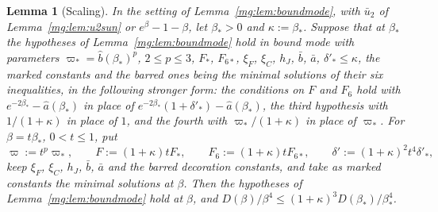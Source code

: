 \documentclass[11pt,a4paper]{article}
\newtheorem{lemma}[theorem]{Lemma}
\theoremstyle{definition}
\theoremstyle{remark}
\begin{document}
\begin{lemma}[Scaling]\label{mg:lem:scaling}
In the setting of Lemma~\ref{mg:lem:boundmode}, with $\bar u_2$ of Lemma~\ref{mg:lem:u2sun} or $e^\beta-1-\beta$, let $\beta_*>0$ and $\kappa:=\beta_*$. Suppose that at $\beta_*$ the hypotheses of
Lemma~\ref{mg:lem:boundmode} hold in bound mode with parameters $\varpi_*=\hat b(\beta_*)^p$, $2\le p\le3$, $F_*$, $F_{6*}$, $\xi_F$, $\xi_C$, $h_J$, $\bar b$, $\bar a$, $\delta'_*\le\kappa$, the marked constants and
the barred ones being the minimal solutions of their six inequalities, in the following stronger form: the conditions on $F$ and $F_6$ hold with $e^{-2\beta_*}-\hat a(\beta_*)$ in place of
$e^{-2\beta_*}(1+\delta'_*)-\hat a(\beta_*)$, the third hypothesis with $1/(1+\kappa)$ in place of $1$, and the fourth with $\varpi_*/(1+\kappa)$ in place of $\varpi_*$. For $\beta=t\beta_*$,
$0<t\le1$, put
\[
\varpi:=t^p\varpi_*,\qquad F:=(1+\kappa)tF_*,\qquad F_6:=(1+\kappa)tF_{6*},\qquad\delta':=(1+\kappa)^2t^4\delta'_*,
\]
keep $\xi_F$, $\xi_C$, $h_J$, $\bar b$, $\bar a$ and the barred decoration constants, and take as marked constants the minimal solutions at $\beta$. Then the hypotheses of
Lemma~\ref{mg:lem:boundmode} hold at $\beta$, and $D(\beta)/\beta^4\le(1+\kappa)^3D(\beta_*)/\beta_*^4$.
\end{lemma}
\end{document}
